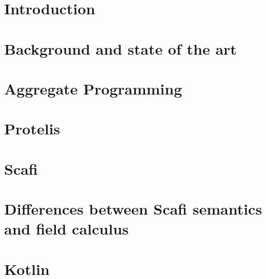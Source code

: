



\clearpage\null\thispagestyle{empty}

\maketitle

\clearpage\null\thispagestyle{empty}

\tableofcontents

\chapter{Introduction}\label{chap:intro}



\chapter{Background and state of the art}\label{chap:history}



\chapter{Aggregate Programming}\label{chap:aggregate}



\chapter{Protelis}\label{chap:protelis}



\chapter{Scafi}\label{chap:scafi}



\chapter{Differences between Scafi semantics and field calculus}\label{chap:comparison}



\chapter{Kotlin}\label{chap:kotlin}


